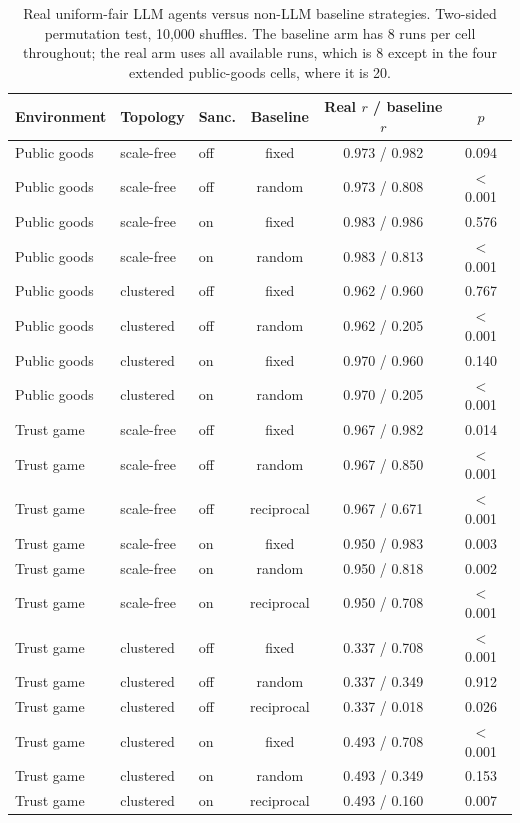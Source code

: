\documentclass[11pt,a4paper]{article}
\begin{document}
\begin{table}[htbp]
\centering
\small
\caption{Real uniform-fair LLM agents versus non-LLM baseline
strategies. Two-sided permutation test, 10,000 shuffles. The baseline
arm has 8 runs per cell throughout; the real arm uses all available
runs, which is 8 except in the four extended public-goods cells, where
it is 20.}
\label{tab:baseline}
\begin{tabular}{lllccc}
\toprule
Environment & Topology & Sanc. & Baseline & Real $r$ / baseline $r$ & $p$ \\
\midrule
Public goods & scale-free & off & fixed      & 0.973 / 0.982 & 0.094 \\
Public goods & scale-free & off & random     & 0.973 / 0.808 & $<$0.001 \\
Public goods & scale-free & on  & fixed      & 0.983 / 0.986 & 0.576 \\
Public goods & scale-free & on  & random     & 0.983 / 0.813 & $<$0.001 \\
Public goods & clustered  & off & fixed      & 0.962 / 0.960 & 0.767 \\
Public goods & clustered  & off & random     & 0.962 / 0.205 & $<$0.001 \\
Public goods & clustered  & on  & fixed      & 0.970 / 0.960 & 0.140 \\
Public goods & clustered  & on  & random     & 0.970 / 0.205 & $<$0.001 \\
\midrule
Trust game & scale-free & off & fixed      & 0.967 / 0.982 & 0.014 \\
Trust game & scale-free & off & random     & 0.967 / 0.850 & $<$0.001 \\
Trust game & scale-free & off & reciprocal & 0.967 / 0.671 & $<$0.001 \\
Trust game & scale-free & on  & fixed      & 0.950 / 0.983 & 0.003 \\
Trust game & scale-free & on  & random     & 0.950 / 0.818 & 0.002 \\
Trust game & scale-free & on  & reciprocal & 0.950 / 0.708 & $<$0.001 \\
Trust game & clustered  & off & fixed      & 0.337 / 0.708 & $<$0.001 \\
Trust game & clustered  & off & random     & 0.337 / 0.349 & 0.912 \\
Trust game & clustered  & off & reciprocal & 0.337 / 0.018 & 0.026 \\
Trust game & clustered  & on  & fixed      & 0.493 / 0.708 & $<$0.001 \\
Trust game & clustered  & on  & random     & 0.493 / 0.349 & 0.153 \\
Trust game & clustered  & on  & reciprocal & 0.493 / 0.160 & 0.007 \\
\bottomrule
\end{tabular}
\end{table}
\end{document}
